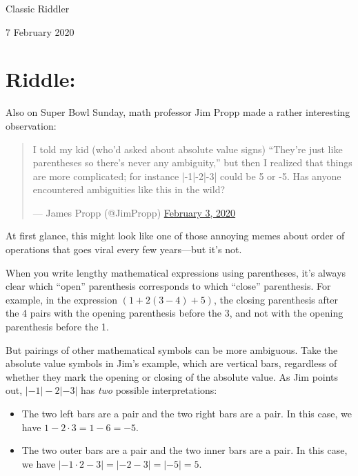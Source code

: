 \documentclass{article}
\begin{document}
\pagestyle{empty} %

\begin{center}
{\LARGE Classic Riddler}

\vspace{0.15in}

{\Large 7 February 2020}
\end{center}


\section*{Riddle:}

Also on Super Bowl Sunday, math professor Jim Propp made a rather interesting observation:

\begin{quote}
I told my kid (who’d asked about absolute value signs) ``They’re just like parentheses so there’s never any ambiguity,'' but then I realized that things are more complicated; for instance |-1|-2|-3| could be 5 or -5. Has anyone encountered ambiguities like this in the wild?

— James Propp (@JimPropp) \href{https://twitter.com/JimPropp/status/1224177172362989571}{February 3, 2020}
\end{quote}

At first glance, this might look like one of those annoying memes about order of operations that goes viral every few years---but it’s not.

When you write lengthy mathematical expressions using parentheses, it's always clear which ``open'' parenthesis corresponds to which ``close'' parenthesis.
For example, in the expression $(1+2(3-4)+5)$, the closing parenthesis after the 4 pairs with the opening parenthesis before the 3, and not with the opening parenthesis before the 1.

But pairings of other mathematical symbols can be more ambiguous. Take the absolute value symbols in Jim’s example, which are vertical bars, regardless of whether they mark the opening or closing of the absolute value. As Jim points out, $|-1|-2|-3|$ has \textit{two} possible interpretations:

\begin{itemize}
\item The two left bars are a pair and the two right bars are a pair.
In this case, we have $1-2\cdot3=1-6=-5$.

\item The two outer bars are a pair and the two inner bars are a pair.
In this case, we have $|-1\cdot2-3| = |-2-3| = |-5| = 5$.
\end{itemize}
\end{document}
